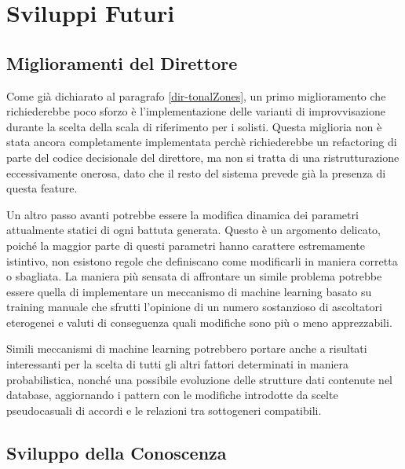 \section{Sviluppi Futuri}
\subsection{Miglioramenti del Direttore}
Come già dichiarato al paragrafo \ref{dir-tonalZones}, un primo miglioramento che richiederebbe poco sforzo è l'implementazione delle varianti di improvvisazione durante la scelta della scala di riferimento per i solisti. Questa miglioria non è stata ancora completamente implementata perchè richiederebbe un refactoring di parte del codice decisionale del direttore, ma non si tratta di una ristrutturazione eccessivamente onerosa, dato che il resto del sistema prevede già la presenza di questa feature.

Un altro passo avanti potrebbe essere la modifica dinamica dei parametri attualmente statici di ogni battuta generata. Questo è un argomento delicato, poiché la maggior parte di questi parametri hanno carattere estremamente istintivo, non esistono regole che definiscano come modificarli in maniera corretta o sbagliata.
La maniera più sensata di affrontare un simile problema potrebbe essere quella di implementare un meccanismo di machine learning basato su training manuale che sfrutti l'opinione di un numero sostanzioso di ascoltatori eterogenei e valuti di conseguenza quali modifiche sono più o meno apprezzabili.

Simili meccanismi di machine learning potrebbero portare anche a risultati interessanti per la scelta di tutti gli altri fattori determinati in maniera probabilistica, nonché una possibile evoluzione delle strutture dati contenute nel database, aggiornando i pattern con le modifiche introdotte da scelte pseudocasuali di accordi e le relazioni tra sottogeneri compatibili.

\subsection{Sviluppo della Conoscenza}

